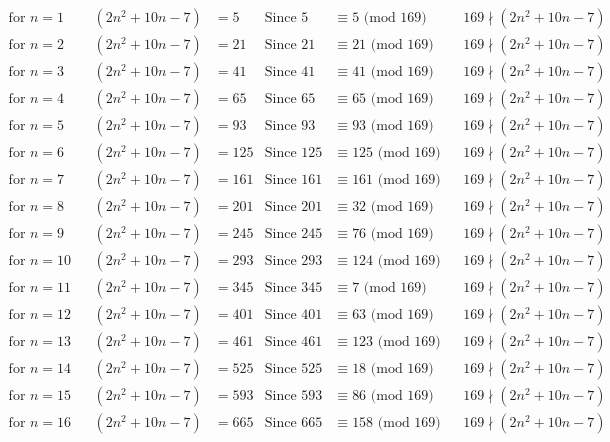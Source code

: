 \documentclass[12pt]{article}
\begin{document}
\allowdisplaybreaks
\begin{align*}
\text{for $n = 1 $}&& (2n^2+10n-7) &= 5 & \text{Since } 5  &\equiv  5 \text{ (mod $169$)}&& 169 \nmid (2n^2+10n-7)\\
\text{for $n = 2 $}&& (2n^2+10n-7) &= 21 & \text{Since } 21  &\equiv  21 \text{ (mod $169$)}&& 169 \nmid (2n^2+10n-7)\\
\text{for $n = 3 $}&& (2n^2+10n-7) &= 41 & \text{Since } 41  &\equiv  41 \text{ (mod $169$)}&& 169 \nmid (2n^2+10n-7)\\
\text{for $n = 4 $}&& (2n^2+10n-7) &= 65 & \text{Since } 65  &\equiv  65 \text{ (mod $169$)}&& 169 \nmid (2n^2+10n-7)\\
\text{for $n = 5 $}&& (2n^2+10n-7) &= 93 & \text{Since } 93  &\equiv  93 \text{ (mod $169$)}&& 169 \nmid (2n^2+10n-7)\\
\text{for $n = 6 $}&& (2n^2+10n-7) &= 125 & \text{Since } 125  &\equiv  125 \text{ (mod $169$)}&& 169 \nmid (2n^2+10n-7)\\
\text{for $n = 7 $}&& (2n^2+10n-7) &= 161 & \text{Since } 161  &\equiv  161 \text{ (mod $169$)}&& 169 \nmid (2n^2+10n-7)\\
\text{for $n = 8 $}&& (2n^2+10n-7) &= 201 & \text{Since } 201  &\equiv  32 \text{ (mod $169$)}&& 169 \nmid (2n^2+10n-7)\\
\text{for $n = 9 $}&& (2n^2+10n-7) &= 245 & \text{Since } 245  &\equiv  76 \text{ (mod $169$)}&& 169 \nmid (2n^2+10n-7)\\
\text{for $n = 10 $}&& (2n^2+10n-7) &= 293 & \text{Since } 293  &\equiv  124 \text{ (mod $169$)}&& 169 \nmid (2n^2+10n-7)\\
\text{for $n = 11 $}&& (2n^2+10n-7) &= 345 & \text{Since } 345  &\equiv  7 \text{ (mod $169$)}&& 169 \nmid (2n^2+10n-7)\\
\text{for $n = 12 $}&& (2n^2+10n-7) &= 401 & \text{Since } 401  &\equiv  63 \text{ (mod $169$)}&& 169 \nmid (2n^2+10n-7)\\
\text{for $n = 13 $}&& (2n^2+10n-7) &= 461 & \text{Since } 461  &\equiv  123 \text{ (mod $169$)}&& 169 \nmid (2n^2+10n-7)\\
\text{for $n = 14 $}&& (2n^2+10n-7) &= 525 & \text{Since } 525  &\equiv  18 \text{ (mod $169$)}&& 169 \nmid (2n^2+10n-7)\\
\text{for $n = 15 $}&& (2n^2+10n-7) &= 593 & \text{Since } 593  &\equiv  86 \text{ (mod $169$)}&& 169 \nmid (2n^2+10n-7)\\
\text{for $n = 16 $}&& (2n^2+10n-7) &= 665 & \text{Since } 665  &\equiv  158 \text{ (mod $169$)}&& 169 \nmid (2n^2+10n-7)\\

\end{align*}
\end{document}
